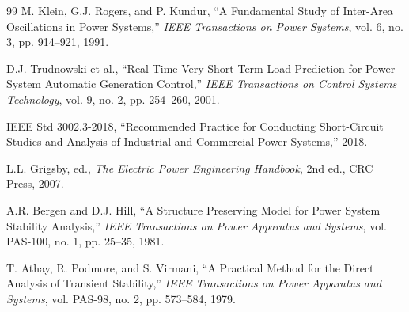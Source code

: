 \documentclass[11pt,a4paper]{article}
\begin{document}
\begin{thebibliography}{99}
M. Klein, G.J. Rogers, and P. Kundur, ``A Fundamental Study of Inter-Area Oscillations in Power Systems,'' \textit{IEEE Transactions on Power Systems}, vol. 6, no. 3, pp. 914--921, 1991.

D.J. Trudnowski et al., ``Real-Time Very Short-Term Load Prediction for Power-System Automatic Generation Control,'' \textit{IEEE Transactions on Control Systems Technology}, vol. 9, no. 2, pp. 254--260, 2001.

IEEE Std 3002.3-2018, ``Recommended Practice for Conducting Short-Circuit Studies and Analysis of Industrial and Commercial Power Systems,'' 2018.

L.L. Grigsby, ed., \textit{The Electric Power Engineering Handbook}, 2nd ed., CRC Press, 2007.

A.R. Bergen and D.J. Hill, ``A Structure Preserving Model for Power System Stability Analysis,'' \textit{IEEE Transactions on Power Apparatus and Systems}, vol. PAS-100, no. 1, pp. 25--35, 1981.

T. Athay, R. Podmore, and S. Virmani, ``A Practical Method for the Direct Analysis of Transient Stability,'' \textit{IEEE Transactions on Power Apparatus and Systems}, vol. PAS-98, no. 2, pp. 573--584, 1979.

\end{thebibliography}
\end{document}
